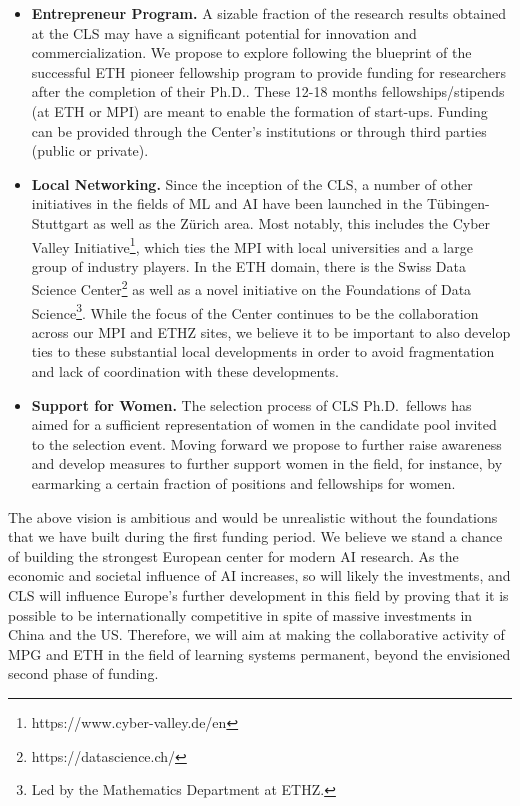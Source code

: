\documentclass{article}
\begin{document}
\begin{itemize}
%
\item \textbf{Entrepreneur Program.}  A sizable fraction of the research results obtained at the CLS may have a significant potential for innovation and commercialization. We propose to explore following the blueprint of the successful ETH pioneer fellowship program to provide funding for researchers after the completion of their Ph.D.. These 12-18 months fellowships/stipends  (at ETH or MPI) are meant to enable the formation of start-ups. Funding can be provided through the Center's institutions or through third parties (public or private).
%
\item \textbf{Local Networking.} Since the inception of the CLS, a number of other initiatives in the fields of ML and AI have been launched in the T\"ubingen-Stuttgart as well as the Z\"urich area. Most notably, this includes the Cyber Valley Initiative\footnote{https://www.cyber-valley.de/en}, which ties the MPI with local universities and a large group of industry players. In the ETH domain, there is the Swiss Data Science Center\footnote{https://datascience.ch/} as well as a novel initiative on the Foundations of Data Science\footnote{Led by the Mathematics Department at ETHZ.}. While the focus of the Center continues to be the collaboration across our MPI and ETHZ sites, we believe it to be important to also develop ties to these substantial local developments in order to avoid fragmentation and lack of coordination with these developments.
%
\item \textbf{Support for Women.} The selection process of CLS Ph.D.~fellows has aimed for a sufficient representation of women in the candidate pool invited to the selection event. Moving forward we propose to further raise awareness and develop measures to further support women in the field, for instance, by earmarking a certain fraction of positions and fellowships for women. 
%
\end{itemize}

The above vision is ambitious and would be unrealistic without the foundations that we have built during the first funding period. We believe we stand a chance of building the strongest European center for modern AI research. As the economic and societal influence of AI increases, so will likely the investments, and CLS will influence Europe's further development in this field by proving that it is possible to be internationally competitive in spite of massive investments in China and the US. Therefore, we will aim at making the collaborative activity of MPG and ETH in the field of learning systems permanent, beyond the envisioned second phase of funding. 
\end{document}
